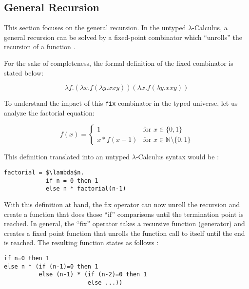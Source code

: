 \subsection{General Recursion}

This section focuses on the general recursion. In the untyped $\lambda$-Calculus,
a general recursion can be solved by a fixed-point combinator
which ``unrolls'' the recursion of a function \cite{pierce2002ProgLang}.

For the sake of completeness, the formal definition of the fixed combinator is stated below:

\begin{equation*}
    \tag{Fixed-Point Combinator}
    \lambda f. (\lambda x. f (\lambda y. x x y)) (\lambda x. f (\lambda y. x x y))
\end{equation*}

To understand the impact of this \texttt{fix} combinator in the typed universe, let
us analyze the factorial equation:

\begin{equation*}
    \tag{Recursive Factorial}
    f(x) =
    \begin{cases}
        1          & \text{for } x \in \{0,1\}                      \\
        x * f(x-1) & \text{for } x \in \mathbb{N} \setminus \{0,1\}
    \end{cases}
\end{equation*}

This definition translated into an untyped $\lambda$-Calculus syntax
would be \cite{pierce2002ProgLang}:

\begin{lstlisting}
factorial = $\lambda$n.
            if n = 0 then 1
            else n * factorial(n-1)
\end{lstlisting}

With this definition at hand, the fix operator can now unroll the recursion
and create a function that does those ``if'' comparisons until the
termination point is reached. In general, the ``fix'' operator
takes a recursive function (generator) and creates a fixed point function that unrolls
the function call to itself until the end is reached.
The resulting function states as follows \cite{pierce2002ProgLang}:

\begin{lstlisting}
if n=0 then 1
else n * (if (n-1)=0 then 1
          else (n-1) * (if (n-2)=0 then 1
                        else ...))
\end{lstlisting}

